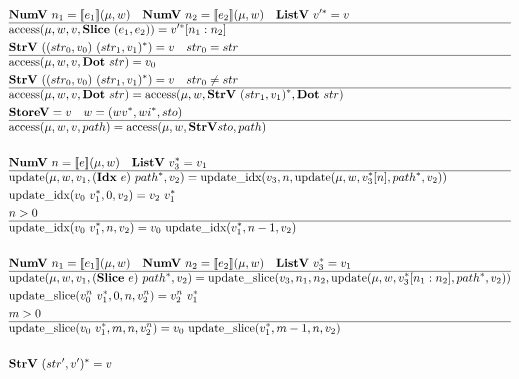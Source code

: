 \begin{align*}
  &\numv ~ n_1 = \sem{e_1}(\mu, w) \quad
  \numv ~ n_2 = \sem{e_2}(\mu, w) \quad
  \listv ~ \seq{v'} = v \\
  \hline
  &\access(\mu, w, v, \slicep ~ (e_1, e_2)) = \seq{v'}[n_1: n_2] \\
  &\strv ~ ((str_0, v_0) ~ \seq{(str_1, v_1)}) = v \quad
  str_0 = str \\
  \hline
  &\access(\mu, w, v, \dotp ~ str) = v_0 \\
  &\strv ~ ((str_0, v_0) ~ \seq{(str_1, v_1)}) = v \quad
  str_0 \not= str \\
  \hline
  &\access(\mu, w, v, \dotp ~ str) = \access(\mu, w, \strv ~ \seq{(str_1, v_1)}, \dotp ~ str) \\
  &\storev = v \quad w = (\seq{wv}, \seq{wi}, sto)\\
  \hline
  &\access(\mu, w, v, path)
  =\access(\mu, w, \strv sto, path) \\
%
\newline \\
  &\numv ~ n = \sem{e}(\mu, w) \quad
  \listv ~ \seq{v_3} = v_1 \\
  \hline
  &\update(\mu, w, v_1, (\idxp ~ e) ~ \seq{path}, v_2)
  =
  \updateidx(v_3, n, \update(\mu, w, \seq{v_3}[n], \seq{path}, v_2)) \\
  &\updateidx(v_0 ~ \seq{v_1}, 0, v_2) =  v_2 ~ \seq{v_1} \\
  &n > 0 \\
  \hline
  &\updateidx(v_0 ~ \seq{v_1}, n, v_2) =  v_0 ~ \updateidx(\seq{v_1}, n-1, v_2) \\
%
\newline \\
  &\numv ~ n_1 = \sem{e_1}(\mu, w) \quad
  \numv ~ n_2 = \sem{e_2}(\mu, w) \quad
  \listv ~ \seq{v_3} = v_1 \\
  \hline
  &\update(\mu, w, v_1, (\slicep ~ e) ~ \seq{path}, v_2)
  =
  \updateslice(v_3, n_1, n_2, \update(\mu, w, \seq{v_3}[n_1: n_2], \seq{path}, v_2)) \\
  &\updateslice(v_0^n ~ \seq{v_1}, 0, n, v_2^n) = v_2^n ~ \seq{v_1} \\
  &m > 0 \\
  \hline
  &\updateslice(v_0 ~ \seq{v_1}, m, n, v_2^n) =  v_0 ~ \updateslice(\seq{v_1}, m-1, n, v_2) \\
%
\newline \\
  &\strv ~ \seq{(str', v')} = v \\

\end{align*}
